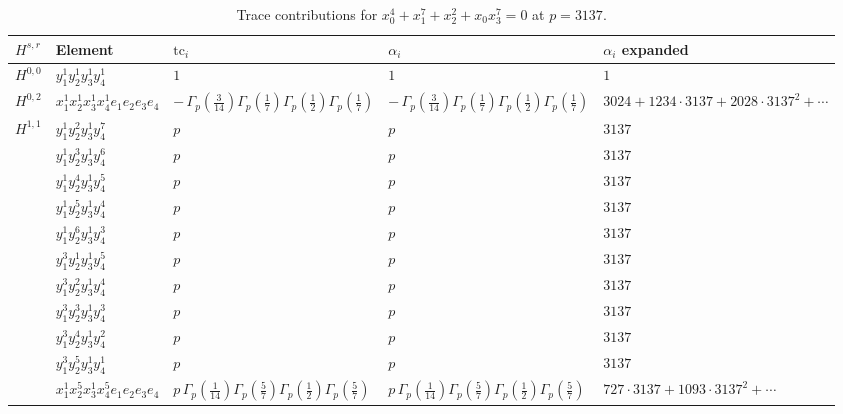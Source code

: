 \documentclass[11pt]{article}
\begin{document}
\begin{table}[ht]
\centering
\caption{Trace contributions for $x_0^{4} + x_1^{7} + x_2^{2} + x_0 x_3^{7} = 0$ at $p=3137$.}\label{tab:deformed-69}
\renewcommand{\arraystretch}{1.1}
{\scriptsize
\begin{tabular}{@{}lllll@{}}
\toprule
$H^{s,r}$ & Element & $\mathrm{tc}_i$ & $\alpha_i$ & $\alpha_i$ expanded \\
\midrule
$H^{0,0}$ & $y_{1}^{1} y_{2}^{1} y_{3}^{1} y_{4}^{1}$ & $1$ & $1$ & $1$ \\
\midrule
$H^{0,2}$ & $x_{1}^{1} x_{2}^{1} x_{3}^{1} x_{4}^{1}  e_{1} e_{2} e_{3} e_{4}$ & $- \, \Gamma_p \left( \frac{3}{14} \right) \Gamma_p \left( \frac{1}{7} \right) \Gamma_p \left( \frac{1}{2} \right) \Gamma_p \left( \frac{1}{7} \right)$ & $- \, \Gamma_p \left( \frac{3}{14} \right) \Gamma_p \left( \frac{1}{7} \right) \Gamma_p \left( \frac{1}{2} \right) \Gamma_p \left( \frac{1}{7} \right)$ & $3024{+}1234{\cdot}3137{+}2028{\cdot}3137^{2}{+}\cdots$ \\
\midrule
$H^{1,1}$ & $y_{1}^{1} y_{2}^{2} y_{3}^{1} y_{4}^{7}$ & $p \,$ & $p \,$ & $3137$ \\
 & $y_{1}^{1} y_{2}^{3} y_{3}^{1} y_{4}^{6}$ & $p \,$ & $p \,$ & $3137$ \\
 & $y_{1}^{1} y_{2}^{4} y_{3}^{1} y_{4}^{5}$ & $p \,$ & $p \,$ & $3137$ \\
 & $y_{1}^{1} y_{2}^{5} y_{3}^{1} y_{4}^{4}$ & $p \,$ & $p \,$ & $3137$ \\
 & $y_{1}^{1} y_{2}^{6} y_{3}^{1} y_{4}^{3}$ & $p \,$ & $p \,$ & $3137$ \\
 & $y_{1}^{3} y_{2}^{1} y_{3}^{1} y_{4}^{5}$ & $p \,$ & $p \,$ & $3137$ \\
 & $y_{1}^{3} y_{2}^{2} y_{3}^{1} y_{4}^{4}$ & $p \,$ & $p \,$ & $3137$ \\
 & $y_{1}^{3} y_{2}^{3} y_{3}^{1} y_{4}^{3}$ & $p \,$ & $p \,$ & $3137$ \\
 & $y_{1}^{3} y_{2}^{4} y_{3}^{1} y_{4}^{2}$ & $p \,$ & $p \,$ & $3137$ \\
 & $y_{1}^{3} y_{2}^{5} y_{3}^{1} y_{4}^{1}$ & $p \,$ & $p \,$ & $3137$ \\
 & $x_{1}^{1} x_{2}^{5} x_{3}^{1} x_{4}^{5}  e_{1} e_{2} e_{3} e_{4}$ & $p \, \Gamma_p \left( \frac{1}{14} \right) \Gamma_p \left( \frac{5}{7} \right) \Gamma_p \left( \frac{1}{2} \right) \Gamma_p \left( \frac{5}{7} \right)$ & $p \, \Gamma_p \left( \frac{1}{14} \right) \Gamma_p \left( \frac{5}{7} \right) \Gamma_p \left( \frac{1}{2} \right) \Gamma_p \left( \frac{5}{7} \right)$ & $727{\cdot}3137{+}1093{\cdot}3137^{2}{+}\cdots$ \\

\end{tabular}}
\end{table}
\end{document}
